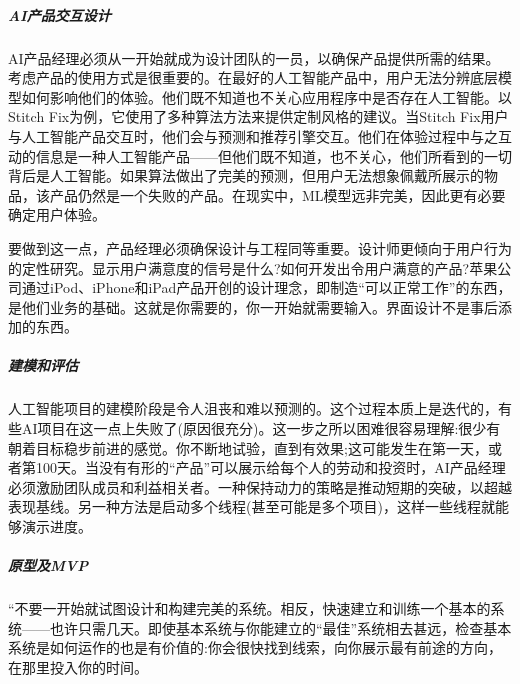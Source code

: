 \documentclass[letterpaper,11pt,english]{sphinxmanual}
\begin{document}
\subparagraph{AI产品交互设计}
\label{\detokenize{chapter_project/process:ai}}
AI产品经理必须从一开始就成为设计团队的一员，以确保产品提供所需的结果。考虑产品的使用方式是很重要的。在最好的人工智能产品中，用户无法分辨底层模型如何影响他们的体验。他们既不知道也不关心应用程序中是否存在人工智能。以Stitch
Fix为例，它使用了多种算法方法来提供定制风格的建议。当Stitch
Fix用户与人工智能产品交互时，他们会与预测和推荐引擎交互。他们在体验过程中与之互动的信息是一种人工智能产品——但他们既不知道，也不关心，他们所看到的一切背后是人工智能。如果算法做出了完美的预测，但用户无法想象佩戴所展示的物品，该产品仍然是一个失败的产品。在现实中，ML模型远非完美，因此更有必要确定用户体验。

要做到这一点，产品经理必须确保设计与工程同等重要。设计师更倾向于用户行为的定性研究。显示用户满意度的信号是什么?如何开发出令用户满意的产品?苹果公司通过iPod、iPhone和iPad产品开创的设计理念，即制造“可以正常工作”的东西，是他们业务的基础。这就是你需要的，你一开始就需要输入。界面设计不是事后添加的东西。


\subparagraph{建模和评估}
\label{\detokenize{chapter_project/process:id23}}
人工智能项目的建模阶段是令人沮丧和难以预测的。这个过程本质上是迭代的，有些AI项目在这一点上失败了(原因很充分)。这一步之所以困难很容易理解:很少有朝着目标稳步前进的感觉。你不断地试验，直到有效果;这可能发生在第一天，或者第100天。当没有有形的“产品”可以展示给每个人的劳动和投资时，AI产品经理必须激励团队成员和利益相关者。一种保持动力的策略是推动短期的突破，以超越表现基线。另一种方法是启动多个线程(甚至可能是多个项目)，这样一些线程就能够演示进度。


\subparagraph{原型及MVP}
\label{\detokenize{chapter_project/process:mvp}}
“不要一开始就试图设计和构建完美的系统。相反，快速建立和训练一个基本的系统——也许只需几天。即使基本系统与你能建立的“最佳”系统相去甚远，检查基本系统是如何运作的也是有价值的:你会很快找到线索，向你展示最有前途的方向，在那里投入你的时间。
%
\begin{footnote}[726]\sphinxAtStartFootnote
{}
%
\end{footnote}
\end{document}
